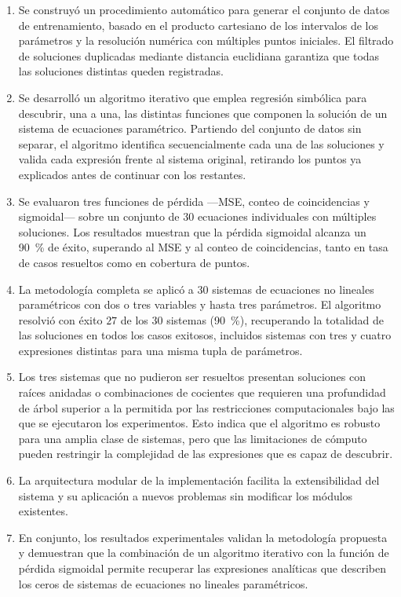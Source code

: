 \documentclass[12pt,a4paper]{article} \usepackage[utf8]{inputenc} \usepackage[spanish]{babel} \usepackage{amsmath, amssymb, amsthm} \usepackage{bm} \usepackage{float} \usepackage{longtable} \usepackage[hidelinks]{hyperref}
\begin{document}
\begin{enumerate}
\item Se construyó un procedimiento automático para generar el conjunto de datos de entrenamiento, basado en el producto cartesiano de los intervalos de los parámetros y la resolución numérica con múltiples puntos iniciales. El filtrado de soluciones duplicadas mediante distancia euclidiana garantiza que todas las soluciones distintas queden registradas.

\item Se desarrolló un algoritmo iterativo que emplea regresión simbólica para descubrir, una a una, las distintas funciones que componen la solución de un sistema de ecuaciones paramétrico. Partiendo del conjunto de datos sin separar, el algoritmo identifica secuencialmente cada una de las soluciones y valida cada expresión frente al sistema original, retirando los puntos ya explicados antes de continuar con los restantes.

\item Se evaluaron tres funciones de pérdida —MSE, conteo de coincidencias y sigmoidal— sobre un conjunto de $30$ ecuaciones individuales con múltiples soluciones. Los resultados muestran que la pérdida sigmoidal alcanza un 90~\% de éxito, superando al MSE y al conteo de coincidencias, tanto en tasa de casos resueltos como en cobertura de puntos.

\item La metodología completa se aplicó a $30$ sistemas de ecuaciones no lineales paramétricos con dos o tres variables y hasta tres parámetros. El algoritmo resolvió con éxito $27$ de los $30$ sistemas (90~\%), recuperando la totalidad de las soluciones en todos los casos exitosos, incluidos sistemas con tres y cuatro expresiones distintas para una misma tupla de parámetros.

\item Los tres sistemas que no pudieron ser resueltos presentan soluciones con raíces anidadas o combinaciones de cocientes que requieren una profundidad de árbol superior a la permitida por las restricciones computacionales bajo las que se ejecutaron los experimentos. Esto indica que el algoritmo es robusto para una amplia clase de sistemas, pero que las limitaciones de cómputo pueden restringir la complejidad de las expresiones que es capaz de descubrir.

\item La arquitectura modular de la implementación facilita la extensibilidad del sistema y su aplicación a nuevos problemas sin modificar los módulos existentes.

\item En conjunto, los resultados experimentales validan la metodología propuesta y demuestran que la combinación de un algoritmo iterativo con la función de pérdida sigmoidal permite recuperar las expresiones analíticas que describen los ceros de sistemas de ecuaciones no lineales paramétricos.
\end{enumerate}
\end{document}
